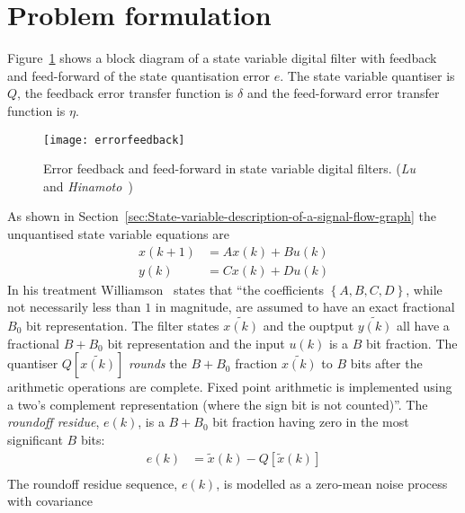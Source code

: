 \documentclass[a4paper,twoside,10pt,english]{report}
\begin{document}
\section{Problem formulation}
Figure~\ref{fig:error-feedback-in-state-variable-digital-filter}
\cite[Figure 2]{LuHinamoto_JointlyOptimizedErrorFeedbackStateSpaceFilters}
shows a block diagram of a state variable digital filter with feedback and 
feed-forward of the state quantisation error $e$. The state variable quantiser 
is $Q$, the feedback error transfer function is $\delta$ and the feed-forward
error transfer function is $\eta$. 
\begin{figure}[!htbp]
\centering
\texttt{[image: errorfeedback]}
\caption{Error feedback and feed-forward in state variable digital filters. 
(\emph{Lu} and \emph{Hinamoto}~\cite[Figure 2]{LuHinamoto_JointlyOptimizedErrorFeedbackStateSpaceFilters})}
\label{fig:error-feedback-in-state-variable-digital-filter}
\end{figure}
As shown in Section~\ref{sec:State-variable-description-of-a-signal-flow-graph}
the unquantised state variable equations are
\begin{align*}
x\left(k+1\right)&=Ax\left(k\right) + Bu\left(k\right) \\
y\left(k\right)&=Cx\left(k\right) + Du\left(k\right)
\end{align*}
In his treatment 
Williamson~\cite{Williamson_RoundoffNoiseMinimizationUsingResidueFeedback}  
states that 
``the coefficients $\left\{A,B,C,D\right\}$, while not necessarily less than $1$
in magnitude, are assumed to have an exact fractional $B_{0}$ bit representation.
The filter states $\tilde{x\left(k\right)}$ and the ouptput
$\tilde{y\left(k\right)}$ all have a fractional $B+B_{0}$ bit representation 
and the input $u\left(k\right)$ is a $B$ bit fraction. The quantiser 
$Q\left[\tilde{x\left(k\right)}\right]$ \emph{rounds} the $B+B_{0}$ fraction 
$\tilde{x\left(k\right)}$ to $B$ bits after the arithmetic operations are 
complete. Fixed point arithmetic is implemented using a two's complement 
representation (where the sign bit is not counted)''. The \emph{roundoff 
residue}, $e\left(k\right)$, is a $B+B_{0}$ bit fraction having zero in the most
significant $B$ bits:
\begin{align*}
e\left(k\right) &= \tilde{x}\left(k\right) - 
Q\left[\tilde{x}\left(k\right)\right] \\
\end{align*}
The roundoff residue sequence, $e\left(k\right)$, is modelled as
a zero-mean noise process with covariance
\end{document}
